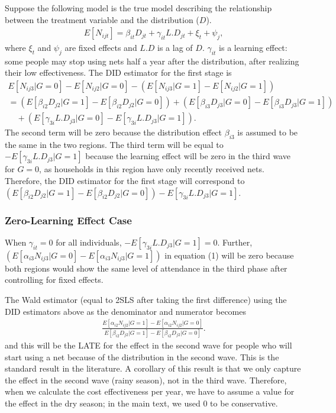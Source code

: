 \documentclass[fleqn,11pt]{article}
\begin{document}
Suppose the following model is the true model describing the relationship between the treatment variable and the distribution ($D$).
\begin{gather*}
E[N_{ijt}] = \beta_{it} D_{jt} + \gamma_{it} L.D_{jt} +  \xi_{t} + \psi_{j}, 
\end{gather*}
where $\xi_{t} $ and $\psi_{j}$ are fixed effects and $L.D$ is a lag of $D$.  $\gamma_{it}$ is a learning effect: some people may stop using nets half a year after the distribution, after realizing their low effectiveness. The DID estimator for the first stage is
\begin{gather*}
E[N_{ij3}|G=0] - E[N_{ij2}|G=0]  - \left(E[N_{ij3}|G=1] - E[N_{ij2}|G=1] \right) \\
=\left( E[\beta_{i2} D_{j2}|G=1]   - E[\beta_{i2}D_{j2}|G=0]\right) +  \left(  E[\beta_{i3}D_{j3}|G=0] - E[\beta_{i3} D_{j3}|G=1]  \right) \\
\quad +  \left(  E[\gamma_{3i}L.D_{j3}|G=0] - E[\gamma_{3i} L.D_{j3}|G=1]  \right) .
\end{gather*}
The second term will be zero because the distribution effect $\beta_{i3}$ is assumed to be the same in the two regions. The third term will be equal to $- E[\gamma_{3i} L.D_{j3}|G=1]$ because the learning effect will be zero in the third wave for $G=0$, as households in this region have only recently received nets. Therefore, the DID estimator for the first stage will correspond to $\left( E[\beta_{i2} D_{j2}|G=1]   - E[\beta_{i2}D_{j2}|G=0]\right)  - E[\gamma_{3i} L.D_{j3}|G=1] $.

\subsubsection{Zero-Learning Effect Case}
When $\gamma_{it} = 0$ for all individuals, $ - E[\gamma_{3i} L.D_{j3}|G=1] = 0$. Further,  
 $ \left(  E[\alpha_{i3}N_{ij3}|G=0] - E[\alpha_{i3} N_{ij3}|G=1] \right) $ in equation (1) will be zero because both regions would show the same level of attendance in the third phase after controlling for fixed effects. 


The Wald estimator (equal to 2SLS after taking the first difference) using the DID estimators above as the denominator and numerator becomes 
\begin{gather*}
\frac{ E[\alpha_{i2} N_{ij2}|G=1]   - E[\alpha_{i2}N_{ij2}|G=0]}{ E[\beta_{i2} D_{j2}|G=1]   -E[\beta_{i2}D_{j2}|G=0]} .
\end{gather*}
and this will be the LATE for the effect in the second wave for people who will start using a net because of the distribution in the second wave. This is the standard result in the literature. A corollary of this result is that we only capture the effect in the second wave (rainy season), not in the third wave. Therefore, when we calculate the cost effectiveness per year, we have to assume a value for the effect in the dry season; in the main text, we used 0 to be conservative.
\end{document}

